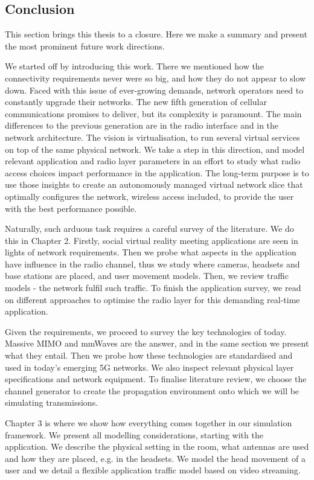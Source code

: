 \subsection*{Conclusion}

This section brings this thesis to a closure. Here we make a summary and present the most prominent future work directions.

We started off by introducing this work. There we mentioned how the connectivity requirements never were so big, and how they do not appear to slow down. Faced with this issue of ever-growing demands, network operators need to constantly upgrade their networks. The new fifth generation of cellular communications promises to deliver, but its complexity is paramount. The main differences to the previous generation are in the radio interface and in the network architecture. The vision is virtualisation, to run several virtual services on top of the same physical network. We take a step in this direction, and model relevant application and radio layer parameters in an effort to study what radio access choices impact performance in the application. The long-term purpose is to use those insights to create an autonomously managed virtual network slice that optimally configures the network, wireless access included, to provide the user with the best performance possible.


Naturally, such arduous task requires a careful survey of the literature. We do this in Chapter 2. Firstly, social virtual reality meeting applications are seen in lights of network requirements. Then we probe what aspects in the application have influence in the radio channel, thus we study where cameras, headsets and base stations are placed, and user movement models. Then, we review traffic models - the network fulfil such traffic. To finish the application survey, we read on different approaches to optimise the radio layer for this demanding real-time application.

Given the requirements, we proceed to survey the key technologies of today. Massive MIMO and mmWaves are the answer, and in the same section we present what they entail. Then we probe how these technologies are standardised and used in today's emerging 5G networks. We also inspect relevant physical layer specifications and network equipment. To finalise literature review, we choose the channel generator to create the propagation environment onto which we will be simulating transmissions.

Chapter 3 is where we show how everything comes together in our simulation framework. We present all modelling considerations, starting with the application. We describe the physical setting in the room, what antennas are used and how they are placed, e.g. in the headsets. We model the head movement of a user and we detail a flexible application traffic model based on video streaming.

